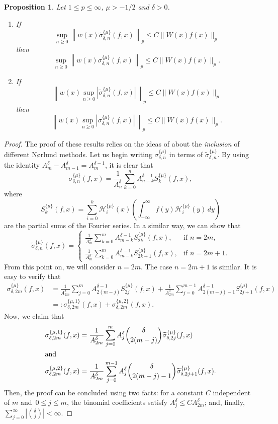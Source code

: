 \documentclass{amsart}
\theoremstyle{plain}
\newtheorem{Prop}{Proposition}
\theoremstyle{definition}
\theoremstyle{remark}
\newcommand{\chem}[3]{\sigma_{#1,#2}^{\{#3\}}} %
\newcommand{\chemmod}[3]{\widetilde{\sigma}_{#1,#2}^{\{#3\}}} %
\newcommand{\fouhe}[2]{S_{#1}^{\{#2\}}} %
\newcommand{\herfun}[2]{\mathcal{H}_{#1}^{\{#2\}}}
\newcommand{\combi}[2]{A_{#1}^{#2}}
\newcommand{\I}{\infty}
\begin{document}
\begin{Prop}
\label{Propo2} Let $1\le p \le \I$, $\mu>-1/2$ and $\delta>0$.
\begin{enumerate}
\item[a)] If
\[
  \sup_{n\ge 0} \left\|w(x)\chemmod{\delta}{n}{\mu}(f,x)\right\|_{p}
  \le C \|W(x)f(x)\|_{p}
\]
then
\[
  \sup_{n\ge 0} \left\|w(x)\chem{\delta}{n}{\mu}(f,x)\right\|_p
  \le C \|W(x)f(x)\|_p.
\]
\item[b)] If
\[
  \left\|w(x)\sup_{n\ge 0} \left|\chemmod{\delta}{n}{\mu}(f,x)\right|\right\|_{p}
  \le C \|W(x)f(x)\|_{p}
\]
then
\[
  \left\|w(x)\sup_{n\ge 0} \left|\chem{\delta}{n}{\mu}(f,x)\right|\right\|_p
  \le C \|W(x)f(x)\|_p.
\]
\end{enumerate}
\end{Prop}

\begin{proof}
The proof of these results relies on the ideas of \cite[\S\,4.3]{H} about
the \emph{inclusion} of different N{\o}rlund methods. Let us begin
writing $\chem{\delta}{n}{\mu}$ in terms of $\chemmod{\delta}{n}{\mu}$.
By using the identity
$\combi{m}{\delta}-\combi{m-1}{\delta} = \combi{m}{\delta-1}$,
it is clear that
\[
  \chem{\delta}{n}{\mu}(f,x)
  = \frac{1}{\combi{n}{\delta}} \sum_{k=0}^{n}\combi{n-k}{\delta-1} \fouhe{k}{\mu}(f,x),
\]
where
\[
  \fouhe{k}{\mu}(f,x) = \sum_{i=0}^k \herfun{i}{\mu}(x)
   \left(\int_{-\I}^\I f(y)\herfun{i}{\mu}(y)\,dy\right)
\]
are the partial sums of the Fourier series.
In a similar way, we can show that
\[
  \chemmod{\delta}{n}{\mu}(f,x) =
  \begin{cases} \displaystyle
    \frac{1}{\combi{m}{\delta}} \sum_{k=0}^m \combi{m-k}{\delta-1} \fouhe{2k}{\mu}(f,x),
      &\text{if $n=2m$,}\\[4mm]
    \displaystyle
    \frac{1}{\combi{m}{\delta}}\sum_{k=0}^m \combi{m-k}{\delta-1} \fouhe{2k+1}{\mu}(f,x),
      &\text{if $n=2m+1$.}
  \end{cases}
\]
From this point on, we will consider $n=2m$. The case $n=2m+1$ is similar. It is easy to verify that
\begin{align*}
  \chem{\delta}{2m}{\mu}(f,x)
  &= \frac{1}{\combi{2m}{\delta}} \sum_{j=0}^{m}\combi{2(m-j)}{\delta-1} \fouhe{2j}{\mu}(f,x)
  + \frac{1}{\combi{2m}{\delta}} \sum_{j=0}^{m-1}\combi{2(m-j)-1}{\delta-1} \fouhe{2j+1}{\mu}(f,x) \\
  &=: \chem{\delta}{2m}{\mu,1}(f,x) + \chem{\delta}{2m}{\mu,2}(f,x).
\end{align*}
Now, we claim that
\begin{align}
\label{ec:Id1}
  \chem{\delta}{2m}{\mu,1}(f,x)
  &= \frac{1}{\combi{2m}{\delta}}\sum_{j=0}^m
    \combi{j}{\delta} \binom{\delta}{2(m-j)} \chemmod{\delta}{2j}{\mu}(f,x)\\
\intertext{and}
\label{ec:Id2}
  \chem{\delta}{2m}{\mu,2}(f,x)
  &= \frac{1}{\combi{2m}{\delta}} \sum_{j=0}^{m-1}
   \combi{j}{\delta}\binom{\delta}{2(m-j)-1}\chemmod{\delta}{2j+1}{\mu}(f,x).
\end{align}
Then, the proof can be concluded using two facts:
for a constant $C$ independent of $m$ and~$0 \le j \le m$,
the binomial coefficients satisfy $\combi{j}{\delta}\le C \combi{2m}{\delta}$;
and, finally, $\sum_{j=0}^\I |\binom{\delta}{j}| < \I$.


\end{proof}
\end{document}
